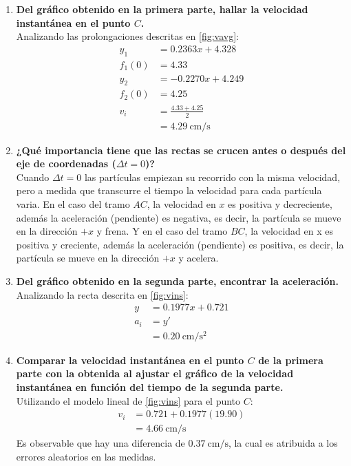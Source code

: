 \documentclass[../main]{subfiles}
\begin{document}
\begin{enumerate}
  \item \textbf{Del gráfico obtenido en la primera parte, hallar la velocidad instantánea en el punto $C$.}\\
    Analizando las prolongaciones descritas en \ref{fig:vavg}:
    \begin{align*}
      y_1 &= 0.2363x + 4.328\\
      f_1(0) &= 4.33\\
      y_2 &= -0.2270x + 4.249\\
      f_2(0) &= 4.25\\
      v_i &= \frac{4.33 + 4.25}{2}\\
          &= \qty{4.29}{\cm\per\s}
    \end{align*}
  \item \textbf{¿Qué importancia tiene que las rectas se crucen antes o después del eje de
coordenadas ($\Delta t = 0$)?}\\
    Cuando $\Delta t = 0$ las partículas empiezan su recorrido con la misma velocidad, pero a medida que transcurre el tiempo la velocidad para cada partícula varia. 
    En el caso del tramo $AC$, la velocidad en $x$ es positiva y decreciente, además la aceleración (pendiente) es negativa, es decir, la partícula se mueve en la dirección $+x$ y frena.
    Y en el caso del tramo $BC$, la velocidad en x es positiva y creciente, además la aceleración (pendiente) es positiva, es decir, la partícula se mueve en la dirección $+x$ y acelera.
  \item \textbf{Del gráfico obtenido en la segunda parte, encontrar la aceleración.}\\
    Analizando la recta descrita en \ref{fig:vins}:
    \begin{align*}
      y &= 0.1977x + 0.721\\
      a_i &= y'\\
          &= \qty{0.20}{\cm\per\second\squared}
    \end{align*}
  \item \textbf{Comparar la velocidad instantánea en el punto $C$ de la primera parte con la obtenida al ajustar el gráfico de la velocidad instantánea en función del tiempo de la segunda parte.}\\
    Utilizando el modelo lineal de \ref{fig:vins} para el punto $C$:
    \begin{align*}
      v_i &= 0.721 + 0.1977(19.90)\\
          &= \qty{4.66}{\cm\per\s}
    \end{align*}
    Es observable que hay una diferencia de $\qty{0.37}{\cm\per\s}$, la cual es atribuida a los errores aleatorios en las medidas.
\end{enumerate}
\end{document}

